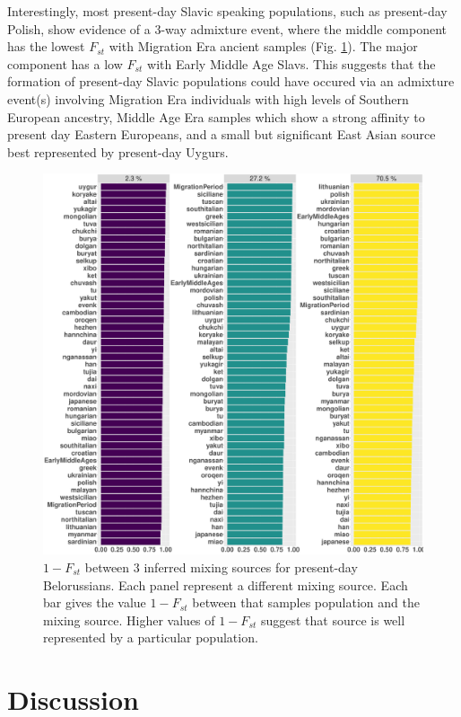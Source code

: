 Interestingly, most present-day Slavic speaking populations, such as present-day Polish, show evidence of a 3-way admixture event, where the middle component has the lowest $F_{st}$ with Migration Era ancient samples (Fig. \ref{fig:Fst_plot_HB:lithuanian}). The major component has a low $F_{st}$ with Early Middle Age Slavs. This suggests that the formation of present-day Slavic populations could have occured via an admixture event(s) involving Migration Era individuals with high levels of Southern European ancestry, Middle Age Era samples which show a strong affinity to present day Eastern Europeans, and a small but significant East Asian source best represented by present-day Uygurs. 


\begin{figure}[htp]
    \centering
    \includegraphics[width=1.0\textwidth]{../images/chapter5/Fst_plot_HB:belorussian.pdf}
    \caption{$1 - F_{st}$ between 3 inferred mixing sources for present-day Belorussians. Each panel represent a different mixing source. Each bar gives the value $1-F_{st}$ between that samples population and the mixing source. Higher values of $1-F_{st}$ suggest that source is well represented by a particular population. }
    \label{fig:Fst_plot_HB:lithuanian}
\end{figure} 

\section{Discussion}

